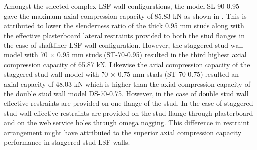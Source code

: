 Amongst the selected complex LSF wall configurations, the model SL-90-0.95 gave the maximum axial compression capacity of 85.83 kN as shown in . This is attributed to lower the slenderness ratio of the thick 0.95 mm studs along with the effective plasterboard lateral restraints provided to both the stud flanges in the case of shaftliner LSF wall configuration. However, the staggered stud wall model with 70 $\times$ 0.95 mm studs (ST-70-0.95) resulted in the third highest axial compression capacity of 65.87 kN. Likewise the axial compression capacity of the staggered stud wall model with 70 $\times$ 0.75 mm studs (ST-70-0.75) resulted an axial capacity of 48.03 kN which is higher than the axial compression capacity of the double stud wall model DS-70-0.75. However, in the case of double stud wall effective restraints are provided on one flange of the stud. In the case of staggered stud wall effective restraints are provided on the stud flange through plasterboard and on the web service holes through omega nogging. This difference in restraint arrangement might have attributed to the superior axial compression capacity performance in staggered stud LSF walls.
